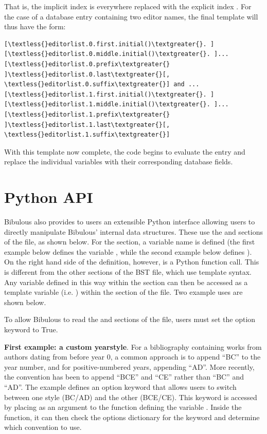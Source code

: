\documentclass[letterpaper,10pt,english]{sphinxmanual}
\begin{document}
That is, the implicit index  is everywhere replaced with the explicit index . For the case of a database entry containing two editor names, the final template will thus have the form:

\begin{Verbatim}[commandchars=\\\{\}]
[\textless{}editorlist.0.first.initial()\textgreater{}. ][\textless{}editorlist.0.middle.initial()\textgreater{}. ]...
[\textless{}editorlist.0.prefix\textgreater{} ]\textless{}editorlist.0.last\textgreater{}[, \textless{}editorlist.0.suffix\textgreater{}] and ...
[\textless{}editorlist.1.first.initial()\textgreater{}. ][\textless{}editorlist.1.middle.initial()\textgreater{}. ]...
[\textless{}editorlist.1.prefix\textgreater{} ]\textless{}editorlist.1.last\textgreater{}[, \textless{}editorlist.1.suffix\textgreater{}]
\end{Verbatim}

With this template now complete, the code begins to evaluate the entry and replace the individual variables with their corresponding database fields.


\section{Python API}
\label{guidelines_for_writing_style_templates:python-api}
Bibulous also provides to users an extensible Python interface allowing users to directly manipulate Bibulous' internal data structures. These use the  and  sections of the file, as shown below. For the  section, a variable name is defined (the first example below defines the variable , while the second example below defines ). On the right hand side of the definition, however, is a Python function call. This is different from the other sections of the BST file, which use template syntax. Any variable defined in this way within the  section can then be accessed as a template variable (i.e. ) within the  section of the file. Two example uses are shown below.

To allow Bibulous to read the  and  sections of the file, users must set the option keyword  to True.

\textbf{First example: a custom yearstyle}. For a bibliography containing works from authors dating from before year 0, a common approach is to append ``BC'' to the year number, and for positive-numbered years, appending ``AD''. More recently, the convention has been to append ``BCE'' and ``CE'' rather than ``BC'' and ``AD''. The example defines an option keyword  that allows users to switch between one style (BC/AD) and the other (BCE/CE). This keyword is accessed by placing  as an argument to the  function defining the variable . Inside the function, it can then check the options dictionary for the  keyword and determine which convention to use.
\end{document}
